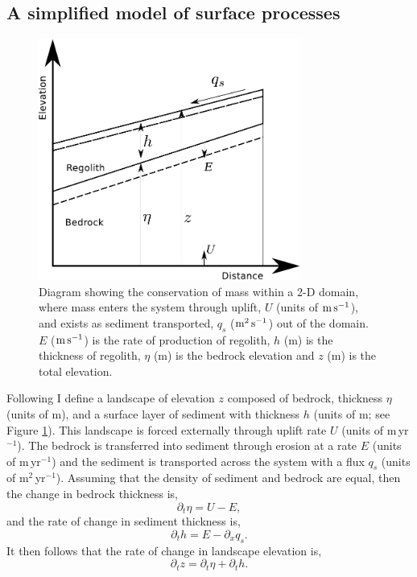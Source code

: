 \subsection{A simplified model of surface processes}

\begin{figure}
\centering
\includegraphics[width=8.6cm]{./figures/ch2-erosion-diagram.pdf}
\caption{Diagram showing the conservation of mass within a 2-D domain, where mass enters the system through uplift, $U$ (units of $\rm m\,s^{-1}$), and exists as sediment transported, $q_{s}$ ($\rm m^{2}\,s^{-1}$) out of the domain. $E$ ($\rm m\,s^{-1}$) is the rate of production of regolith, $h$ (m) is the thickness of regolith, $\eta$ (m) is the bedrock elevation and $z$ (m) is the total elevation.}
\label{fg:1dmodel}
\end{figure}

Following \cite{dietrich-etal-2003} I define a landscape of elevation $z$ composed of bedrock, thickness $\eta$ (units of m), and a surface layer of sediment with thickness $h$ (units of m; see Figure \ref{fg:1dmodel}). This landscape is forced externally through uplift rate $U$ (units of m\,yr$^{-1}$). The bedrock is transferred into sediment through erosion at a rate $E$ (units of m\,yr$^{-1}$) and the sediment is transported across the system with a flux $q_{s}$ (units of m$^2$\,yr$^{-1}$). Assuming that the density of sediment and bedrock are equal, then the change in bedrock thickness is,
\begin{equation}
\partial_{t}\eta = U - E,
\label{eq:bedrock}
\end{equation}
and the rate of change in sediment thickness is,
\begin{equation}
\partial_{t}h = E - \partial_{x}q_{s}.
\label{eq:sediment}
\end{equation}
It then follows that the rate of change in landscape elevation is,
\begin{equation}
\partial_{t}z = \partial_{t}\eta + \partial_{t}h.
\label{eq:elevation}
\end{equation}

